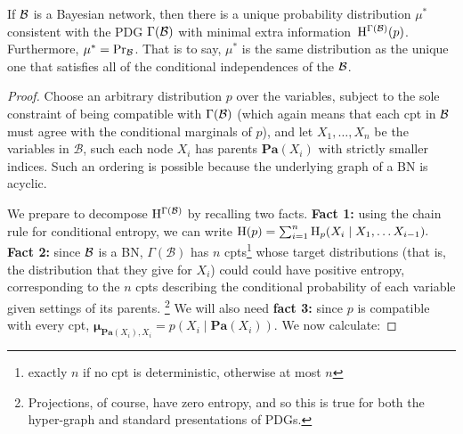\documentclass{article}
\newcommand{\bmu}{\boldsymbol{\mu}}
\def\Pa{\mathbf{Pa}}
\def\extrainfo{extra information}
\begin{document}
\begin{theorem}\label{thm:bns-are-pdgs}
	If $\cal B$ is a Bayesian network, then there is a unique probability distribution $\mu^*$ consistent with the PDG $\Gamma(\cal B)$ with minimal \extrainfo\ $\mathrm{H}^{\Gamma(\mathcal B)}(p)$. Furthermore, $\mu^* = \Pr_{\cal B}$. That is to say, $\mu^*$ is the same distribution as the unique one that satisfies all of the conditional independences of the $\cal B$.	
\end{theorem}
\begin{proof}%
	Choose an arbitrary distribution $p$ over the variables, subject to the sole constraint of being compatible with $\Gamma(\cal B)$ (which again means that each cpt in $\cal B$ must agree with the conditional marginals of $p$), and let $X_1, \ldots, X_n$ be the variables in $\mathcal B$, such each node $X_i$ has parents $\Pa(X_i)$ with strictly smaller indices. Such an ordering is possible because the underlying graph of a BN is acyclic. 
	
	We prepare to decompose $\mathrm{H}^{\Gamma(\cal B)}$ by recalling two facts. 
	\textbf{Fact 1:} using the chain rule for conditional entropy, we can write 
	$ \mathrm{H}(p) = \sum_{i = 1}^n \mathrm{H}_p(X_i \mid X_1, \ldots X_{i-1}). $
	\textbf{Fact 2:}
	since $\cal B$ is a BN, $\Gamma(\mathcal B)$ has $n$ cpts\footnote{exactly $n$ if no cpt is deterministic, otherwise at most $n$} whose target distributions (that is, the distribution that they give for $X_i$) could could have positive entropy, corresponding to the $n$ cpts describing the conditional probability of each variable given settings of its parents.%
	 	\footnote{Projections, of course, have zero entropy, and so this is true for both the hyper-graph and standard presentations of PDGs.}
	We will also need 
	\textbf{fact 3:} since $p$ is compatible with every cpt, $\bmu_{\Pa(X_i),X_i} = p(X_i \mid \Pa(X_i))$. 
	We now calculate:
		
		

\end{proof}
\end{document}
